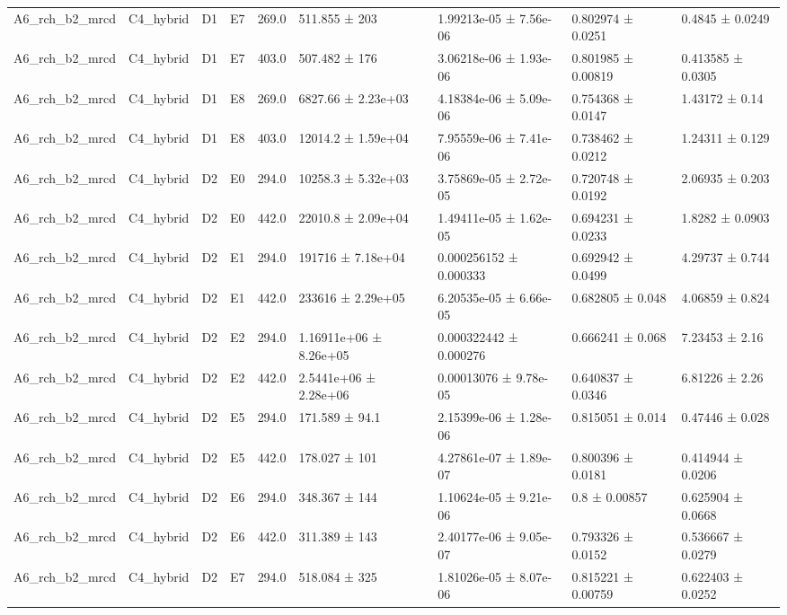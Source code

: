 \begin{table}
\begin{tabular}{lllllllll}
A6\_rch\_b2\_mrcd & C4\_hybrid & D1 & E7 & 269.0 & 511.855 ± 203 & 1.99213e-05 ± 7.56e-06 & 0.802974 ± 0.0251 & 0.4845 ± 0.0249 \\
A6\_rch\_b2\_mrcd & C4\_hybrid & D1 & E7 & 403.0 & 507.482 ± 176 & 3.06218e-06 ± 1.93e-06 & 0.801985 ± 0.00819 & 0.413585 ± 0.0305 \\
A6\_rch\_b2\_mrcd & C4\_hybrid & D1 & E8 & 269.0 & 6827.66 ± 2.23e+03 & 4.18384e-06 ± 5.09e-06 & 0.754368 ± 0.0147 & 1.43172 ± 0.14 \\
A6\_rch\_b2\_mrcd & C4\_hybrid & D1 & E8 & 403.0 & 12014.2 ± 1.59e+04 & 7.95559e-06 ± 7.41e-06 & 0.738462 ± 0.0212 & 1.24311 ± 0.129 \\
A6\_rch\_b2\_mrcd & C4\_hybrid & D2 & E0 & 294.0 & 10258.3 ± 5.32e+03 & 3.75869e-05 ± 2.72e-05 & 0.720748 ± 0.0192 & 2.06935 ± 0.203 \\
A6\_rch\_b2\_mrcd & C4\_hybrid & D2 & E0 & 442.0 & 22010.8 ± 2.09e+04 & 1.49411e-05 ± 1.62e-05 & 0.694231 ± 0.0233 & 1.8282 ± 0.0903 \\
A6\_rch\_b2\_mrcd & C4\_hybrid & D2 & E1 & 294.0 & 191716 ± 7.18e+04 & 0.000256152 ± 0.000333 & 0.692942 ± 0.0499 & 4.29737 ± 0.744 \\
A6\_rch\_b2\_mrcd & C4\_hybrid & D2 & E1 & 442.0 & 233616 ± 2.29e+05 & 6.20535e-05 ± 6.66e-05 & 0.682805 ± 0.048 & 4.06859 ± 0.824 \\
A6\_rch\_b2\_mrcd & C4\_hybrid & D2 & E2 & 294.0 & 1.16911e+06 ± 8.26e+05 & 0.000322442 ± 0.000276 & 0.666241 ± 0.068 & 7.23453 ± 2.16 \\
A6\_rch\_b2\_mrcd & C4\_hybrid & D2 & E2 & 442.0 & 2.5441e+06 ± 2.28e+06 & 0.00013076 ± 9.78e-05 & 0.640837 ± 0.0346 & 6.81226 ± 2.26 \\
A6\_rch\_b2\_mrcd & C4\_hybrid & D2 & E5 & 294.0 & 171.589 ± 94.1 & 2.15399e-06 ± 1.28e-06 & 0.815051 ± 0.014 & 0.47446 ± 0.028 \\
A6\_rch\_b2\_mrcd & C4\_hybrid & D2 & E5 & 442.0 & 178.027 ± 101 & 4.27861e-07 ± 1.89e-07 & 0.800396 ± 0.0181 & 0.414944 ± 0.0206 \\
A6\_rch\_b2\_mrcd & C4\_hybrid & D2 & E6 & 294.0 & 348.367 ± 144 & 1.10624e-05 ± 9.21e-06 & 0.8 ± 0.00857 & 0.625904 ± 0.0668 \\
A6\_rch\_b2\_mrcd & C4\_hybrid & D2 & E6 & 442.0 & 311.389 ± 143 & 2.40177e-06 ± 9.05e-07 & 0.793326 ± 0.0152 & 0.536667 ± 0.0279 \\
A6\_rch\_b2\_mrcd & C4\_hybrid & D2 & E7 & 294.0 & 518.084 ± 325 & 1.81026e-05 ± 8.07e-06 & 0.815221 ± 0.00759 & 0.622403 ± 0.0252 \\

\end{tabular}
\end{table}

